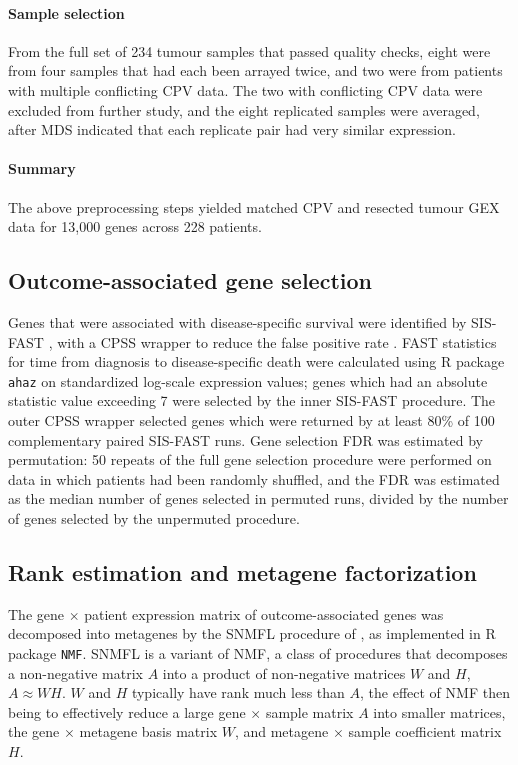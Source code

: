 \documentclass[dissertation.tex]{subfiles}
\begin{document}
\paragraph{Sample selection}  From the full set of 234 tumour samples that passed quality checks, eight were from four samples that had each been arrayed twice, and two were from patients with multiple conflicting \gls{CPV} data.  The two with conflicting \gls{CPV} data were excluded from further study, and the eight replicated samples were averaged, after \gls{MDS} indicated that each replicate pair had very similar expression.

\paragraph{Summary}
The above preprocessing steps yielded matched \gls{CPV} and resected tumour \gls{GEX} data for 13,000 genes across 228 patients.

\subsection{Outcome-associated gene selection}
Genes that were associated with disease-specific survival were identified by \gls{SIS}-\gls{FAST} \cite{Gorst-Rasmussen2013}, with a \gls{CPSS} wrapper to reduce the false positive rate \cite{Shah2013}.  \gls{FAST} statistics for time from diagnosis to disease-specific death were calculated using R package \texttt{ahaz} on standardized log-scale expression values; genes which had an absolute statistic value exceeding 7 were selected by the inner \gls{SIS}-\gls{FAST} procedure.  The outer \gls{CPSS} wrapper selected genes which were returned by at least 80\% of 100 complementary paired \gls{SIS}-\gls{FAST} runs.  Gene selection \gls{FDR} was estimated by permutation: 50 repeats of the full gene selection procedure were performed on data in which patients had been randomly shuffled, and the \gls{FDR} was estimated as the median number of genes selected in permuted runs, divided by the number of genes selected by the unpermuted procedure.

\subsection{Rank estimation and metagene factorization}
\label{subsec:sigs-nmf}
The gene $\times$ patient expression matrix of outcome-associated genes was decomposed into metagenes by the \gls{SNMFL} procedure of \cite{Kim2007}, as implemented in R package \texttt{NMF}.  \gls{SNMFL} is a variant of \gls{NMF}, a class of procedures that decomposes a non-negative matrix $A$ into a product of non-negative matrices $W$ and $H$, $A \approx WH$.  $W$ and $H$ typically have rank much less than $A$, the effect of \gls{NMF} then being to effectively reduce a large gene $\times$ sample matrix $A$ into smaller matrices, the gene $\times$ metagene basis matrix $W$, and metagene $\times$ sample coefficient matrix $H$.
\end{document}
